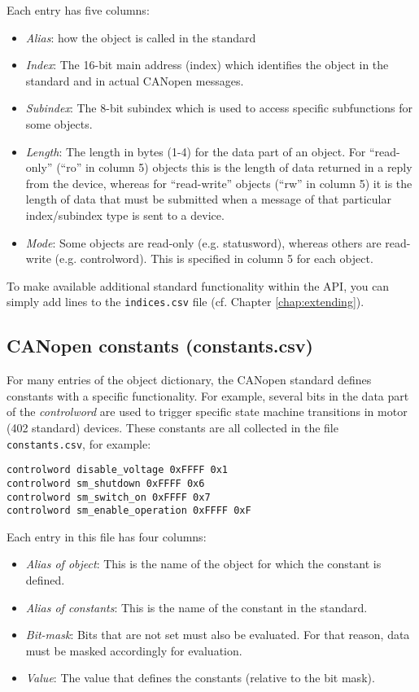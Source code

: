 Each entry has five columns:
\begin{itemize}
\item {\em Alias}: how the object is called in the standard
\item {\em Index}: The 16-bit main address (index) which identifies the object in the standard and in actual CANopen messages.
\item {\em Subindex}: The 8-bit subindex which is used to access specific subfunctions for some objects.
\item {\em Length}: The length in bytes (1-4) for the data part of an object. For ``read-only'' (``ro'' in column 5) objects this is the length of data returned in a reply from the device, whereas for ``read-write'' objects (``rw'' in column 5) it is the length of data that must be submitted when a message of that particular index/subindex type is sent to a device.
\item {\em Mode}: Some objects are read-only (e.g. statusword), whereas others are read-write (e.g. controlword). This is specified in column 5 for each object.
\end{itemize}

To make available additional standard functionality within the API, you can simply add lines to the \texttt{indices.csv} file (cf. Chapter \ref{chap:extending}).

\subsection{CANopen constants (constants.csv)}
\label{sec:constants}

For many entries of the object dictionary, the CANopen standard defines constants with a specific functionality. For example, several bits in the data part of the {\em controlword} are used to trigger specific state machine transitions in motor (402 standard) devices. These constants are all collected in the file \texttt{constants.csv}, for example:
\begin{verbatim}
controlword disable_voltage 0xFFFF 0x1
controlword sm_shutdown 0xFFFF 0x6
controlword sm_switch_on 0xFFFF 0x7
controlword sm_enable_operation 0xFFFF 0xF
\end{verbatim}

Each entry in this file has four columns:
\begin{itemize}
\item {\em Alias of object}: This is the name of the object for which the constant is defined.
\item {\em Alias of constants}: This is the name of the constant in the standard.
\item {\em Bit-mask}: Bits that are not set must also be evaluated. For that reason, data must be masked accordingly for evaluation.
\item {\em Value}: The value that defines the constants (relative to the bit mask).
\end{itemize}


